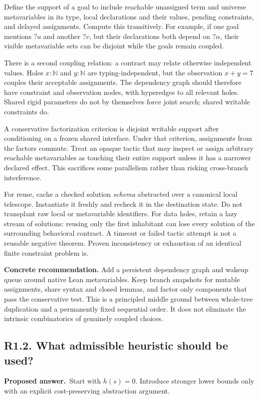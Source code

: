 \documentclass[11pt,a4paper]{article}
\newcommand{\Nat}{\mathbb{N}}
\newcommand{\question}[2]{\subsection{#1. #2}\label{q:#1}}
\newcommand{\answer}{\textbf{Proposed answer.}\ }
\theoremstyle{remark}
\begin{document}
Define the support of a goal to include reachable unassigned term and universe
metavariables in its type, local declarations and their values, pending
constraints, and delayed assignments. Compute this transitively. For example,
if one goal mentions $\mathord?u$ and another $\mathord?v$, but their
declarations both depend on $\mathord?\alpha$, their visible metavariable
sets can be disjoint while the goals remain coupled.

There is a second coupling relation: a contract may relate otherwise
independent values. Holes $x:\Nat$ and $y:\Nat$ are typing-independent, but
the observation $x+y=7$ couples their acceptable assignments. The dependency
graph should therefore have constraint and observation nodes, with hyperedges
to all relevant holes. Shared rigid parameters do not by themselves force
joint search; shared writable constraints do.

A conservative factorization criterion is disjoint writable support after
conditioning on a frozen shared interface. Under that criterion, assignments
from the factors commute. Treat an opaque tactic that may inspect or assign
arbitrary reachable metavariables as touching their entire support unless it
has a narrower declared effect. This sacrifices some parallelism rather than
risking cross-branch interference.

For reuse, cache a checked solution \emph{schema} abstracted over a canonical
local telescope. Instantiate it freshly and recheck it in the destination
state. Do not transplant raw local or metavariable identifiers. For data
holes, retain a lazy stream of solutions: reusing only the first inhabitant
can lose every solution of the surrounding behavioral contract. A timeout
or failed tactic attempt is not a reusable negative theorem. Proven
inconsistency or exhaustion of an identical finite constraint problem is.

\textbf{Concrete recommendation.} Add a persistent dependency graph and wakeup
queue around native Lean metavariables. Keep branch snapshots for mutable
assignments, share syntax and closed lemmas, and factor only components that
pass the conservative test. This is a principled middle ground between
whole-tree duplication and a permanently fixed sequential order. It does not
eliminate the intrinsic combinatorics of genuinely coupled choices.

\question{R1.2}{What admissible heuristic should be used?}

\answer Start with $h(s)=0$. Introduce stronger lower bounds only with an
explicit cost-preserving abstraction argument.
\end{document}
